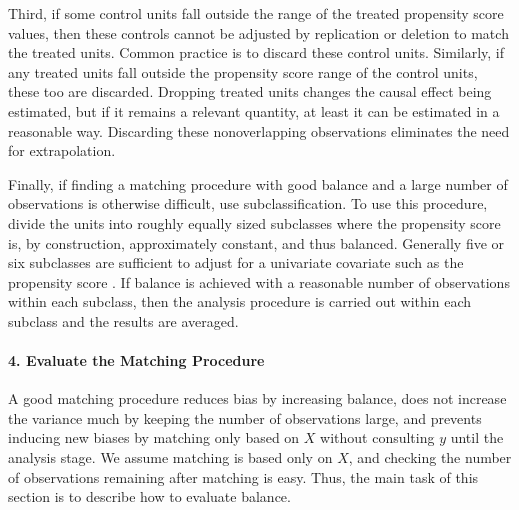 \documentclass[11pt,titlepage]{article}
\begin{document}
Third, if some control units fall outside the range of the treated
propensity score values, then these controls cannot be adjusted by
replication or deletion to match the treated units.  Common practice
is to discard these control units.  Similarly, if any treated units
fall outside the propensity score range of the control units, these too are
discarded.  Dropping treated units changes the causal effect being
estimated, but if it remains a relevant quantity, at least it can be
estimated in a reasonable way.  Discarding these nonoverlapping
observations eliminates the need for extrapolation.

Finally, if finding a matching procedure with good balance and a large
number of observations is otherwise difficult, use subclassification.
To use this procedure, divide the units into roughly equally sized
subclasses where the propensity score is, by construction,
approximately constant, and thus balanced.  Generally five or six
subclasses are sufficient to adjust for a univariate covariate such as
the propensity score \citep{Cochran68,RosRub84}.  If balance is
achieved with a reasonable number of observations within each
subclass, then the analysis procedure is carried out within each
subclass and the results are averaged.

\paragraph{4. Evaluate the Matching Procedure}
A good matching procedure reduces bias by increasing balance, does not
increase the variance much by keeping the number of observations
large, and prevents inducing new biases by matching only based on $X$
without consulting $y$ until the analysis stage.  We assume matching
is based only on $X$, and checking the number of observations
remaining after matching is easy.  Thus, the main task of this section
is to describe how to evaluate balance.
\end{document}
